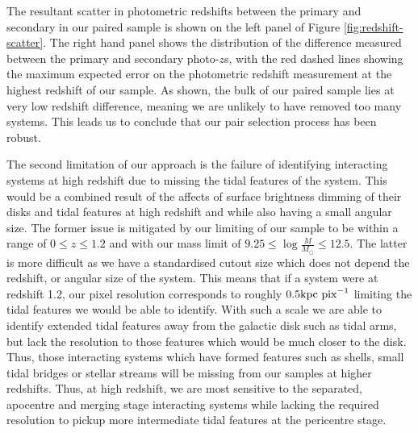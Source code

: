 The resultant scatter in photometric redshifts between the primary and secondary in our paired sample is shown on the left panel of Figure \ref{fig:redshift-scatter}. The right hand panel shows the distribution of the difference measured between the primary and secondary photo-$z$s, with the red dashed lines showing the maximum expected error on the photometric redshift measurement at the highest redshift of our sample. As shown, the bulk of our paired sample lies at very low redshift difference, meaning we are unlikely to have removed too many systems. This leads us to conclude that our pair selection process has been robust.

The second limitation of our approach is the failure of identifying interacting systems at high redshift due to missing the tidal features of the system. This would be a combined result of the affects of surface brightness dimming of their disks and tidal features at high redshift and while also having a small angular size. The former issue is mitigated by our limiting of our sample to be within a range of $0 \leq z \leq 1.2$ and with our mass limit of $9.25 \leq \log \frac{M}{M_\odot} \leq 12.5$. The latter is more difficult as we have a standardised cutout size which does not depend the redshift, or angular size of the system. This means that if a system were at redshift 1.2, our pixel resolution corresponds to roughly $0.5\rm{kpc~pix}^{-1}$ limiting the tidal features we would be able to identify. With such a scale we are able to identify extended tidal features away from the galactic disk such as tidal arms, but lack the resolution to those features which would be much closer to the disk. Thus, those interacting systems which have formed features such as shells, small tidal bridges or stellar streams will be missing from our samples at higher redshifts. Thus, at high redshift, we are most sensitive to the separated, apocentre and merging stage interacting systems while lacking the required resolution to pickup more intermediate tidal features at the pericentre stage.


